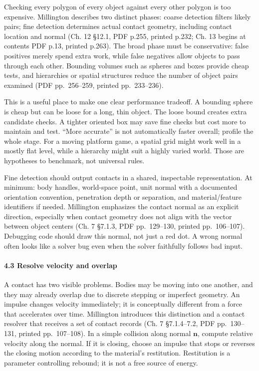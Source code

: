 Checking every polygon of every object against every other polygon is too expensive. Millington describes two distinct phases: coarse detection filters likely pairs; fine detection determines actual contact geometry, including contact location and normal (Ch. 12 §12.1, PDF p.255, printed p.232; Ch. 13 begins at contents PDF p.13, printed p.263). The broad phase must be conservative: false positives merely spend extra work, while false negatives allow objects to pass through each other. Bounding volumes such as spheres and boxes provide cheap tests, and hierarchies or spatial structures reduce the number of object pairs examined (PDF pp.~256--259, printed pp.~233--236).

This is a useful place to make one clear performance tradeoff. A bounding sphere is cheap but can be loose for a long, thin object. The loose bound creates extra candidate checks. A tighter oriented box may save fine checks but cost more to maintain and test. ``More accurate'' is not automatically faster overall; profile the whole stage. For a moving platform game, a spatial grid might work well in a mostly flat level, while a hierarchy might suit a highly varied world. Those are hypotheses to benchmark, not universal rules.

Fine detection should output contacts in a shared, inspectable representation. At minimum: body handles, world-space point, unit normal with a documented orientation convention, penetration depth or separation, and material/feature identifiers if needed. Millington emphasizes the contact normal as an explicit direction, especially when contact geometry does not align with the vector between object centers (Ch. 7 §7.1.3, PDF pp.~129--130, printed pp.~106--107). Debugging code should draw this normal, not just a red dot. A wrong normal often looks like a solver bug even when the solver faithfully follows bad input.

\paragraph{4.3 Resolve velocity and overlap}\label{resolve-velocity-and-overlap}

A contact has two visible problems. Bodies may be moving into one another, and they may already overlap due to discrete stepping or imperfect geometry. An impulse changes velocity immediately; it is conceptually different from a force that accelerates over time. Millington introduces this distinction and a contact resolver that receives a set of contact records (Ch. 7 §7.1.4--7.2, PDF pp.~130--131, printed pp.~107--108). In a simple collision along normal \(\mathbf{n}\), compute relative velocity along the normal. If it is closing, choose an impulse that stops or reverses the closing motion according to the material's restitution. Restitution is a parameter controlling rebound; it is not a free source of energy.

